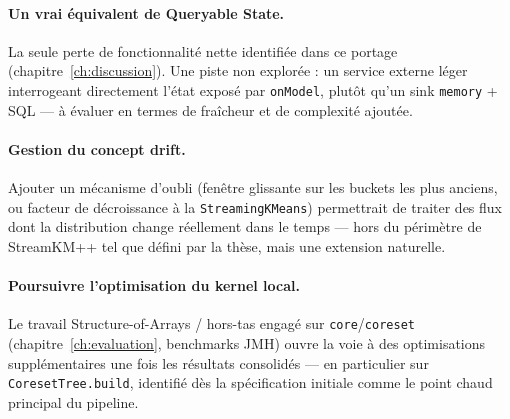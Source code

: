 \paragraph{Un vrai équivalent de Queryable State.} La seule perte de
fonctionnalité nette identifiée dans ce portage
(chapitre~\ref{ch:discussion}). Une piste non explorée : un service externe
léger interrogeant directement l'état exposé par \texttt{onModel}, plutôt
qu'un sink \texttt{memory} + SQL --- à évaluer en termes de fraîcheur et de
complexité ajoutée.

\paragraph{Gestion du concept drift.} Ajouter un mécanisme d'oubli
(fenêtre glissante sur les buckets les plus anciens, ou facteur de
décroissance à la \texttt{StreamingKMeans}) permettrait de traiter des flux
dont la distribution change réellement dans le temps --- hors du périmètre
de StreamKM++ tel que défini par la thèse, mais une extension naturelle.

\paragraph{Poursuivre l'optimisation du kernel local.} Le travail
Structure-of-Arrays / hors-tas engagé sur \texttt{core}/\texttt{coreset}
(chapitre~\ref{ch:evaluation}, benchmarks JMH) ouvre la voie à des
optimisations supplémentaires une fois les résultats consolidés --- en
particulier sur \texttt{CoresetTree.build}, identifié dès la spécification
initiale comme le point chaud principal du pipeline.
